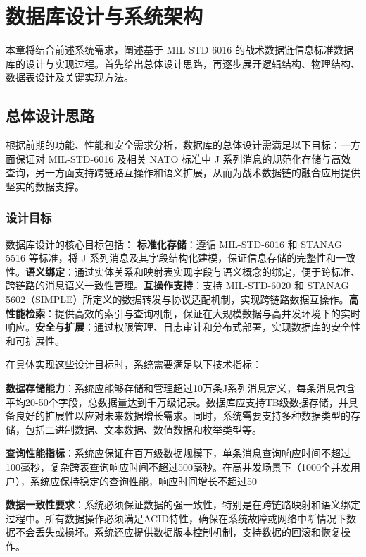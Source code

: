 \chapter{数据库设计与系统架构}

本章将结合前述系统需求，阐述基于 MIL-STD-6016 的战术数据链信息标准数据库的设计与实现过程。首先给出总体设计思路，再逐步展开逻辑结构、物理结构、数据表设计及关键实现方法。

\section{总体设计思路}

根据前期的功能、性能和安全需求分析，数据库的总体设计需满足以下目标：一方面保证对 MIL-STD-6016 及相关 NATO 标准中 J 系列消息的规范化存储与高效查询，另一方面支持跨链路互操作和语义扩展，从而为战术数据链的融合应用提供坚实的数据支撑。

\subsection{设计目标}
数据库设计的核心目标包括：
\textbf{标准化存储}：遵循 MIL-STD-6016 和 STANAG 5516 等标准，将 J 系列消息及其字段结构化建模，保证信息存储的完整性和一致性。\textbf{语义绑定}：通过实体关系和映射表实现字段与语义概念的绑定，便于跨标准、跨链路的消息语义一致性管理。\textbf{互操作支持}：支持 {MIL-STD-6020} 和 STANAG 5602（SIMPLE）所定义的数据转发与协议适配机制，实现跨链路数据互操作。\textbf{高性能检索}：提供高效的索引与查询机制，保证在大规模数据与高并发环境下的实时响应。\textbf{安全与扩展}：通过权限管理、日志审计和分布式部署，实现数据库的安全性和可扩展性。

在具体实现这些设计目标时，系统需要满足以下技术指标：

\textbf{数据存储能力}：系统应能够存储和管理超过10万条J系列消息定义，每条消息包含平均20-50个字段，总数据量达到千万级记录。数据库应支持TB级数据存储，并具备良好的扩展性以应对未来数据增长需求。同时，系统需要支持多种数据类型的存储，包括二进制数据、文本数据、数值数据和枚举类型等。

\textbf{查询性能指标}：系统应保证在百万级数据规模下，单条消息查询响应时间不超过100毫秒，复杂跨表查询响应时间不超过500毫秒。在高并发场景下（1000个并发用户），系统应保持稳定的查询性能，响应时间增长不超过50%

\textbf{数据一致性要求}：系统必须保证数据的强一致性，特别是在跨链路映射和语义绑定过程中。所有数据操作必须满足ACID特性，确保在系统故障或网络中断情况下数据不会丢失或损坏。系统还应提供数据版本控制机制，支持数据的回滚和恢复操作。

